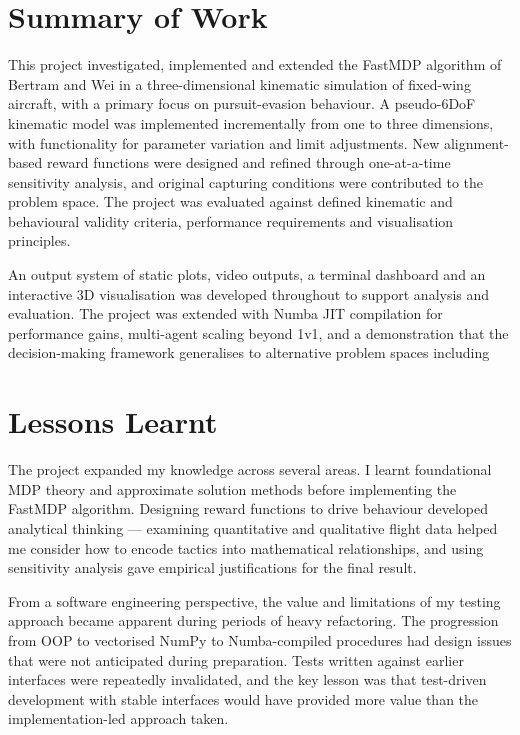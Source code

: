 \label{sec:5}

\section{Summary of Work}
\label{sec:5.1}

This project investigated, implemented and extended the FastMDP algorithm of Bertram and Wei\cite{bertram3d} in a three-dimensional kinematic simulation of fixed-wing aircraft, with a primary focus on pursuit-evasion behaviour. A pseudo-6DoF kinematic model was implemented incrementally from one to three dimensions, with functionality for parameter variation and limit adjustments. New alignment-based reward functions were designed and refined through one-at-a-time sensitivity analysis, and original capturing conditions were contributed to the problem space. The project was evaluated against defined kinematic and behavioural validity criteria, performance requirements and visualisation principles.

An output system of static plots, video outputs, a terminal dashboard and an interactive 3D visualisation was developed throughout to support analysis and evaluation. The project was extended with Numba JIT compilation for performance gains, multi-agent scaling beyond 1v1, and a demonstration that the decision-making framework generalises to alternative problem spaces including  

\section{Lessons Learnt}
\label{sec:5.2}

The project expanded my knowledge across several areas. I learnt foundational MDP theory and approximate solution methods before implementing the FastMDP algorithm. Designing reward functions to drive behaviour developed analytical thinking --- examining quantitative and qualitative flight data helped me consider how to encode tactics into mathematical relationships, and using sensitivity analysis gave empirical justifications for the final result.  

From a software engineering perspective, the value and limitations of my testing approach became apparent during periods of heavy refactoring. The progression from OOP to vectorised NumPy to Numba-compiled procedures had design issues that were not anticipated during preparation. Tests written against earlier interfaces were repeatedly invalidated, and the key lesson was that test-driven development with stable interfaces would have provided more value than the implementation-led approach taken.

